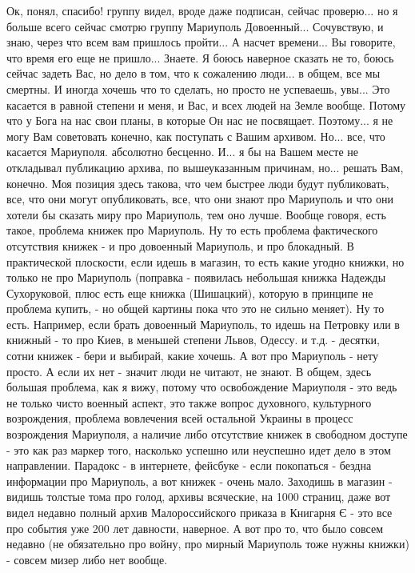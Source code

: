  
 
 
 
 

Ок, понял, спасибо! группу видел, вроде даже подписан, сейчас проверю... но я
больше всего сейчас смотрю группу Мариуполь Довоенный... Сочувствую, и знаю,
через что всем вам пришлось пройти... А насчет времени... Вы говорите, что
время его еще не пришло... Знаете. Я боюсь наверное сказать не то, боюсь сейчас
задеть Вас, но дело в том, что к сожалению люди... в общем, все мы смертны. И
иногда хочешь что то сделать, но просто не успеваешь, увы... Это касается в
равной степени и меня, и Вас, и всех людей на Земле вообще. Потому что у Бога
на нас свои планы, в которые Он нас не посвящает. Поэтому... я не могу Вам
советовать конечно, как поступать с Вашим архивом. Но... все, что касается
Мариуполя. абсолютно бесценно. И... я бы на Вашем месте не откладывал
публикацию архива, по вышеуказанным причинам, но... решать Вам, конечно. Моя
позиция здесь такова, что чем быстрее люди будут публиковать, все, что они
могут опубликовать, все, что они знают про Мариуполь и что они хотели бы
сказать миру про Мариуполь, тем оно лучше. Вообще говоря, есть такое, проблема
книжек про Мариуполь. Ну то есть проблема фактического отсутствия книжек - и
про довоенный Мариуполь, и про блокадный. В практической плоскости, если идешь
в магазин, то есть какие угодно книжки, но только не про Мариуполь (поправка -
появилась небольшая книжка Надежды Сухоруковой, плюс есть еще книжка
(Шишацкий), которую в принципе не проблема купить, - но общей картины пока что
это не сильно меняет). Ну то есть. Например, если брать довоенный Мариуполь, то
идешь на Петровку или в книжный - то про Киев, в меньшей степени Львов, Одессу.
и т.д. - десятки, сотни книжек - бери и выбирай, какие хочешь. А вот про
Мариуполь - нету просто. А если их нет - значит люди не читают, не знают. В
общем, здесь большая проблема, как я вижу, потому что освобождение Мариуполя -
это ведь не только чисто военный аспект, это также вопрос духовного,
культурного возрождения, проблема вовлечения всей остальной Украины в процесс
возрождения Мариуполя, а наличие либо отсутствие книжек в свободном доступе -
это как раз маркер того, насколько успешно или неуспешно идет дело в этом
направлении. Парадокс - в интернете, фейсбуке - если покопаться - бездна
информации про Мариуполь, а вот книжек - очень мало. Заходишь в магазин -
видишь толстые тома про голод, архивы всяческие, на 1000 страниц, даже вот
видел недавно полный архив Малороссийского приказа в Книгарня Є - это все про
события уже 200 лет давности, наверное. А вот про то, что было совсем недавно
(не обязательно про войну, про мирный Мариуполь тоже нужны книжки) - совсем
мизер либо нет вообще.

